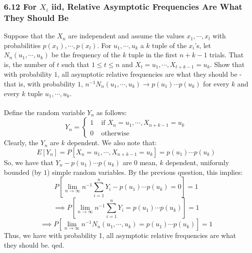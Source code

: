 \documentclass[12pt,a4paper]{article}
\newcommand{\1}[1]{\mathbbm{1}\left\{ #1 \right\}}
\begin{document}
\subsubsection{6.12 For $X_i$ iid, Relative Asymptotic Frequencies Are What They Should Be} Suppose that the $X_n$ are independent and assume the values $x_1, \cdots, x_l$ with probabilities $p(x_1), \cdots, p(x_l)$. For $u_1, \cdots, u_k$ a $k$ tuple of the $x_i$'s, let $N_n(u_1, \cdots, u_k)$ be the frequency of the $k$ tuple in the first $n + k - 1$ trials. That is, the number of $t$ such that $1 \leq t \leq n$ and $X_t = u_1, \cdots, X_{t+k-1} = u_k$. Show that with probability $1$, all asymptotic relative frequencies are what they should be - that is, with probability $1$, $n^{-1}N_n(u_1, \cdots, u_k) \to p(u_1)\cdots p(u_k)$ for every $k$ and every $k$ tuple $u_1, \cdots, u_k$.
\\\\
Define the random variable $Y_n$ as follows:
$$
	Y_n = \begin{cases}
	1 & \text{ if $X_n = u_1, \cdots, X_{n + k - 1} = u_k$}\\
	0 & \text{ otherwise}
	\end{cases}
$$
Clearly, the $Y_n$ are $k$ dependent. We also note that:
$$
	E[Y_n] = P[X_n = u_1, \cdots, X_{n + k - 1} = u_k] = p(u_1) \cdots p(u_k)
$$
So, we have that $Y_n - p(u_1) \cdots p(u_k)$ are $0$ mean, $k$ dependent, uniformly bounded (by $1$) simple random variables. By the previous question, this implies:
$$
	P\left[\lim_{n \to \infty} n^{-1}\sum_{i=1}^n Y_i - p(u_1) \cdots p(u_k) = 0\right] = 1
$$
$$
	\implies
	P\left[\lim_{n \to \infty} n^{-1}\sum_{i=1}^n Y_i = p(u_1) \cdots p(u_k)\right] = 1
$$
$$
	\implies
	P\left[\lim_{n \to \infty} n^{-1} N_n(u_1, \cdots, u_k) = p(u_1) \cdots p(u_k)\right] = 1
$$
Thus, we have with probability 1, all asymptotic relative frequencies are what they should be. qed.
\end{document}

